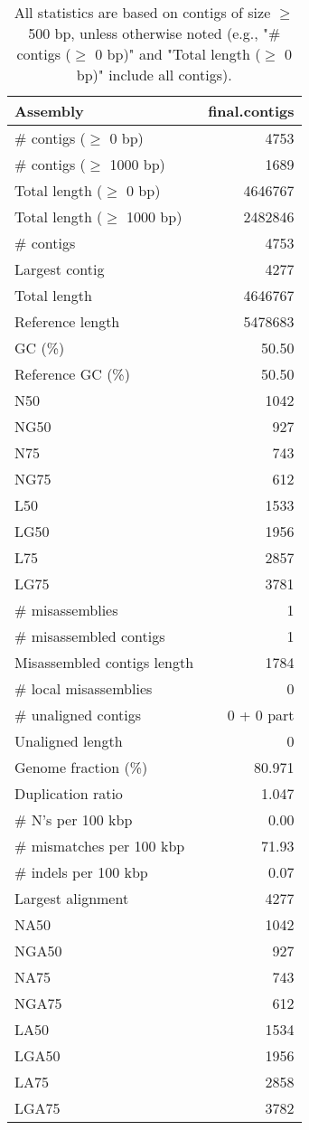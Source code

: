 \documentclass[12pt,a4paper]{article}
\begin{document}
\begin{table}[ht]
\begin{center}
\caption{All statistics are based on contigs of size $\geq$ 500 bp, unless otherwise noted (e.g., "\# contigs ($\geq$ 0 bp)" and "Total length ($\geq$ 0 bp)" include all contigs).}
\begin{tabular}{|l*{1}{|r}|}
\hline
Assembly & final.contigs \\ \hline
\# contigs ($\geq$ 0 bp) & 4753 \\ \hline
\# contigs ($\geq$ 1000 bp) & 1689 \\ \hline
Total length ($\geq$ 0 bp) & 4646767 \\ \hline
Total length ($\geq$ 1000 bp) & 2482846 \\ \hline
\# contigs & 4753 \\ \hline
Largest contig & 4277 \\ \hline
Total length & 4646767 \\ \hline
Reference length & 5478683 \\ \hline
GC (\%) & 50.50 \\ \hline
Reference GC (\%) & 50.50 \\ \hline
N50 & 1042 \\ \hline
NG50 & 927 \\ \hline
N75 & 743 \\ \hline
NG75 & 612 \\ \hline
L50 & 1533 \\ \hline
LG50 & 1956 \\ \hline
L75 & 2857 \\ \hline
LG75 & 3781 \\ \hline
\# misassemblies & 1 \\ \hline
\# misassembled contigs & 1 \\ \hline
Misassembled contigs length & 1784 \\ \hline
\# local misassemblies & 0 \\ \hline
\# unaligned contigs & 0 + 0 part \\ \hline
Unaligned length & 0 \\ \hline
Genome fraction (\%) & 80.971 \\ \hline
Duplication ratio & 1.047 \\ \hline
\# N's per 100 kbp & 0.00 \\ \hline
\# mismatches per 100 kbp & 71.93 \\ \hline
\# indels per 100 kbp & 0.07 \\ \hline
Largest alignment & 4277 \\ \hline
NA50 & 1042 \\ \hline
NGA50 & 927 \\ \hline
NA75 & 743 \\ \hline
NGA75 & 612 \\ \hline
LA50 & 1534 \\ \hline
LGA50 & 1956 \\ \hline
LA75 & 2858 \\ \hline
LGA75 & 3782 \\ \hline
\end{tabular}
\end{center}
\end{table}
\end{document}
